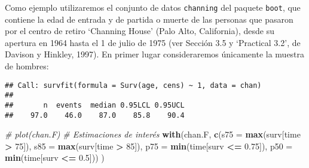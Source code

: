 \documentclass[]{book}
\newenvironment{Shaded}{\begin{snugshade}}{\end{snugshade}}
\newcommand{\KeywordTok}[1]{\textcolor[rgb]{0.13,0.29,0.53}{\textbf{#1}}}
\newcommand{\DataTypeTok}[1]{\textcolor[rgb]{0.13,0.29,0.53}{#1}}
\newcommand{\DecValTok}[1]{\textcolor[rgb]{0.00,0.00,0.81}{#1}}
\newcommand{\FloatTok}[1]{\textcolor[rgb]{0.00,0.00,0.81}{#1}}
\newcommand{\StringTok}[1]{\textcolor[rgb]{0.31,0.60,0.02}{#1}}
\newcommand{\CommentTok}[1]{\textcolor[rgb]{0.56,0.35,0.01}{\textit{#1}}}
\newcommand{\OperatorTok}[1]{\textcolor[rgb]{0.81,0.36,0.00}{\textbf{#1}}}
\newcommand{\NormalTok}[1]{#1}
\theoremstyle{break}
\theoremstyle{definition}
\theoremstyle{definition}
\theoremstyle{definition}
\theoremstyle{remark}
\begin{document}
Como ejemplo utilizaremos el conjunto de datos \texttt{channing} del
paquete \texttt{boot}, que contiene la edad de entrada y de partida o
muerte de las personas que pasaron por el centro de retiro `Channing
House' (Palo Alto, California), desde su apertura en 1964 hasta el 1 de
julio de 1975 (ver Sección 3.5 y `Practical 3.2', de Davison y Hinkley,
1997). En primer lugar consideraremos únicamente la muestra de hombres:

\begin{Shaded}
\end{Shaded}

\begin{verbatim}
## Call: survfit(formula = Surv(age, cens) ~ 1, data = chan)
## 
##       n  events  median 0.95LCL 0.95UCL 
##    97.0    46.0    87.0    85.8    90.4
\end{verbatim}

\begin{Shaded}
\begin{Highlighting}[]
\CommentTok{# plot(chan.F)}
\CommentTok{# Estimaciones de interés}
\KeywordTok{with}\NormalTok{(chan.F, }
    \KeywordTok{c}\NormalTok{(}\DataTypeTok{s75 =} \KeywordTok{max}\NormalTok{(surv[time }\OperatorTok{>}\StringTok{ }\DecValTok{75}\NormalTok{]), }\DataTypeTok{s85 =} \KeywordTok{max}\NormalTok{(surv[time }\OperatorTok{>}\StringTok{ }\DecValTok{85}\NormalTok{]),}
      \DataTypeTok{p75 =} \KeywordTok{min}\NormalTok{(time[surv }\OperatorTok{<=}\StringTok{ }\FloatTok{0.75}\NormalTok{]), }\DataTypeTok{p50 =} \KeywordTok{min}\NormalTok{(time[surv }\OperatorTok{<=}\StringTok{ }\FloatTok{0.5}\NormalTok{])) }
\NormalTok{)}
\end{Highlighting}
\end{Shaded}
\end{document}
